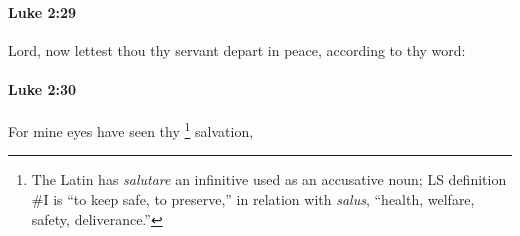 		\paragraph{Luke 2:29} %
			\label{LUKE-2-29}

			Lord, now lettest thou thy servant depart in peace, according to thy word:

			\begin{framed}
			\scriptsize
				\begin{compactdesc}
					\item[SBLG] 
				\end{compactdesc}
			\end{framed}

		\paragraph{Luke 2:30} %
			\label{LUKE-2-30}

			For mine eyes have seen thy
				\footnote{%
					The Latin has \textit{salutare} an infinitive used as an accusative noun; LS definition \#I is ``to keep safe, to preserve,'' in relation with \textit{salus}, ``health, welfare, safety, deliverance.''
					}%
			salvation,

